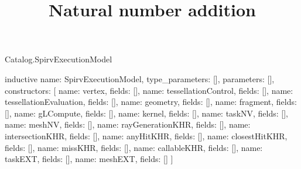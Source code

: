 \begin{lexlean}{Catalog.SpirvExecutionModel}
\title{Natural number addition}
\begin{semanticmodule}
inductive{
  name: SpirvExecutionModel,
  type_parameters: [],
  parameters: [],
  constructors: [
    {name: vertex, fields: []},
    {name: tessellationControl, fields: []},
    {name: tessellationEvaluation, fields: []},
    {name: geometry, fields: []},
    {name: fragment, fields: []},
    {name: gLCompute, fields: []},
    {name: kernel, fields: []},
    {name: taskNV, fields: []},
    {name: meshNV, fields: []},
    {name: rayGenerationKHR, fields: []},
    {name: intersectionKHR, fields: []},
    {name: anyHitKHR, fields: []},
    {name: closestHitKHR, fields: []},
    {name: missKHR, fields: []},
    {name: callableKHR, fields: []},
    {name: taskEXT, fields: []},
    {name: meshEXT, fields: []}
  ]
}
\end{semanticmodule}
\end{lexlean}
